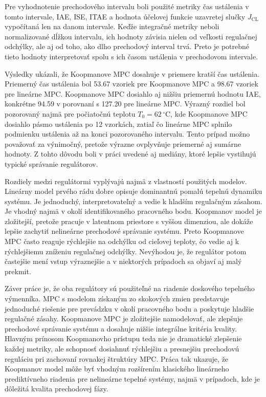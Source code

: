 Pre vyhodnotenie prechodového intervalu boli použité metriky čas ustálenia v tomto intervale, IAE, ISE, ITAE a hodnota účelovej funkcie uzavretej slučky $J_{\mathrm{CL}}$ vypočítaná len na danom intervale. Keďže integračné metriky neboli normalizované dĺžkou intervalu, ich hodnoty závisia nielen od veľkosti regulačnej odchýlky, ale aj od toho, ako dlho prechodový interval trvá. Preto je potrebné tieto hodnoty interpretovať spolu s ich časom ustálenia v prechodovom intervale.

Výsledky ukázali, že Koopmanove MPC dosahuje v priemere kratší čas ustálenia. Priemerný čas ustálenia bol 53.67 vzoriek pre Koopmanove MPC a 98.67 vzoriek pre lineárne MPC. Koopmanove MPC dosiahlo aj nižšiu priemernú hodnotu IAE, konkrétne 94.59 v porovnaní s 127.20 pre lineárne MPC. Výrazný rozdiel bol pozorovaný najmä pre počiatočnú teplotu $T_0 = 62\,^\circ\mathrm{C}$, kde Koopmanove MPC dosiahlo pásmo ustálenia po 12 vzorkách, zatiaľ čo lineárne MPC splnilo podmienku ustálenia až na konci pozorovaného intervalu. Tento prípad možno považovať za výnimočný, pretože výrazne ovplyvňuje priemerné aj sumárne hodnoty. Z tohto dôvodu boli v práci uvedené aj mediány, ktoré lepšie vystihujú typické správanie regulátorov.

Rozdiely medzi regulátormi vyplývajú najmä z vlastností použitých modelov. Lineárny model prvého rádu dobre opisuje dominantnú pomalú tepelnú dynamiku systému. Je jednoduchý, interpretovateľný a vedie k hladším regulačným zásahom. Je vhodný najmä v okolí identifikovaného pracovného bodu. Koopmanov model je zložitejší, pretože pracuje v latentnom priestore s vyššou dimenziou, ale dokáže lepšie zachytiť nelineárne prechodové správanie systému. Preto Koopmanove MPC často reaguje rýchlejšie na odchýlku od cieľovej teploty, čo vedie aj k rýchlejšiemu zníženiu regulačnej odchýlky. Nevýhodou je, že regulátor potom častejšie mení vstup výraznejšie a v niektorých prípadoch sa objaví aj malý prekmit.

Záver práce je, že oba regulátory sú použiteľné na riadenie doskového tepelného výmenníka. MPC s modelom získaným zo skokových zmien predstavuje jednoduché riešenie pre prevádzku v okolí pracovného bodu a poskytuje hladšie regulačné zásahy. Koopmanove MPC je zložitejšie namodelovať, ale zlepšuje prechodové správanie systému a dosahuje nižšie integrálne kritéria kvality. Hlavným prínosom Koopmanovho prístupu teda nie je dramatické zlepšenie každej metriky, ale schopnosť dosiahnuť rýchlejšiu a presnejšiu prechodovú reguláciu pri zachovaní rovnakej štruktúry MPC. Práca tak ukazuje, že Koopmanov model môže byť vhodným rozšírením klasického lineárneho prediktívneho riadenia pre nelineárne tepelné systémy, najmä v prípadoch, kde je dôležitá kvalita prechodovej fázy.